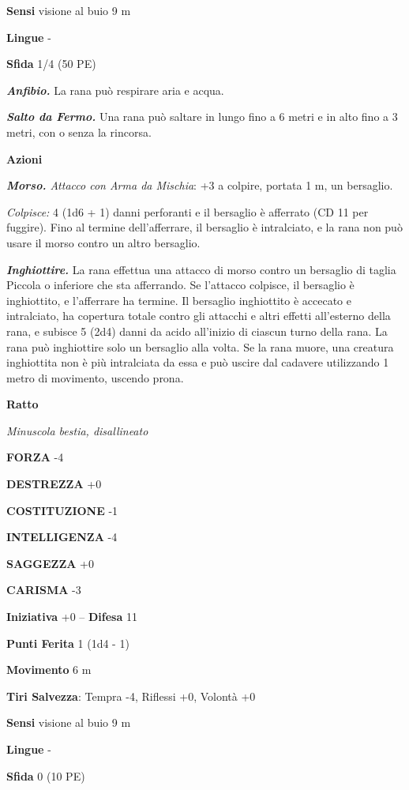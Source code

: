 \begin{multicols}{2}
\textbf{Sensi} visione al buio 9 m

\textbf{Lingue} -

\textbf{Sfida} 1/4 (50 PE)

\emph{\textbf{Anfibio.}} La rana può respirare aria e acqua.

\emph{\textbf{Salto da Fermo.}} Una rana può saltare in lungo fino a 6 metri e in alto fino a 3 metri, con o senza la rincorsa.

\textbf{Azioni}

\emph{\textbf{Morso.} Attacco con Arma da Mischia}: +3 a colpire, portata 1 m, un bersaglio.

\emph{Colpisce:} 4 (1d6 + 1) danni perforanti e il bersaglio è afferrato (CD 11 per fuggire). Fino al termine dell'afferrare, il bersaglio è intralciato, e la rana non può usare il morso contro un altro bersaglio.

\emph{\textbf{Inghiottire.}} La rana effettua una attacco di morso contro un bersaglio di taglia Piccola o inferiore che sta afferrando. Se l'attacco colpisce, il bersaglio è inghiottito, e l'afferrare ha termine. Il bersaglio inghiottito è accecato e intralciato, ha copertura totale contro gli attacchi e altri effetti all'esterno della rana, e subisce 5 (2d4) danni da acido all'inizio di ciascun turno della rana. La rana può inghiottire solo un bersaglio alla volta. Se la rana muore, una creatura inghiottita non è più intralciata da essa e può uscire dal cadavere utilizzando 1 metro di movimento, uscendo prona.

\medskip\textbf{Ratto}

\emph{Minuscola bestia, disallineato}

\textbf{FORZA} -4

\textbf{DESTREZZA} +0

\textbf{COSTITUZIONE} -1

\textbf{INTELLIGENZA} -4

\textbf{SAGGEZZA} +0

\textbf{CARISMA} -3

\textbf{Iniziativa} +0 -- \textbf{Difesa} 11

\textbf{Punti Ferita} 1 (1d4 - 1)

\textbf{Movimento} 6 m

\textbf{Tiri Salvezza}: Tempra -4, Riflessi +0, Volontà +0 

\textbf{Sensi} visione al buio 9 m

\textbf{Lingue} -

\textbf{Sfida} 0 (10 PE)


\end{multicols}
